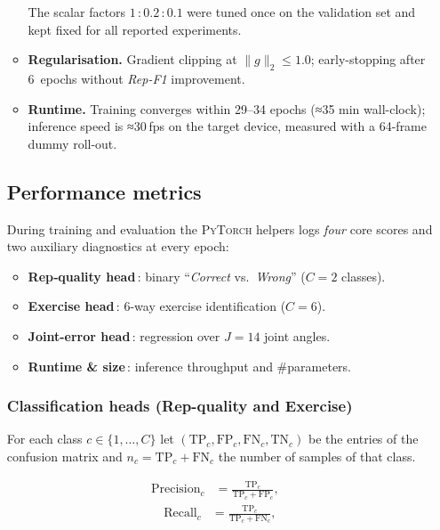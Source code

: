 \documentclass{article}
\begin{document}
\begin{enumerate}[label=\textbf{\Alph*.}, leftmargin=2em, itemsep=6pt]
\begin{itemize}[leftmargin=1.5em, itemsep=4pt]
The scalar factors $1$\,:\,$0.2$\,:\,$0.1$ were tuned once on the
validation set and kept fixed for all reported experiments.

  \item \textbf{Regularisation.}  
        Gradient clipping at $\lVert g\rVert_{2} \le 1.0$;  
        early-stopping after 6~epochs without \textit{Rep-F1} improvement.

  \item \textbf{Runtime.}  
        Training converges within 29–34 epochs (≈35 min wall-clock);  
        inference speed is ≈30 fps on the target device, measured with a
        64-frame dummy roll-out.
\end{itemize}

\subsection{Performance metrics}
\label{sec:metrics}

During training and evaluation the \textsc{PyTorch} helpers logs \emph{four} core scores and two
auxiliary diagnostics at every epoch:

\begin{itemize}[leftmargin=1.5em]
  \item \textbf{Rep‐quality head}\,: binary “\emph{Correct} vs.\ \emph{Wrong}”
        ($C\!=\!2$ classes).
  \item \textbf{Exercise head}\,: 6-way exercise identification
        ($C\!=\!6$).
  \item \textbf{Joint-error head}\,: regression over $J\!=\!14$ joint angles.
  \item \textbf{Runtime \& size}\,: inference throughput and \#parameters.
\end{itemize}

\vspace{.5em}
\subsubsection{Classification heads (Rep-quality and Exercise)}

For each class $c\in\{1,\dots,C\}$ let
$(\text{TP}_c,\text{FP}_c,\text{FN}_c,\text{TN}_c)$ be the entries of
the confusion matrix and $n_c=\text{TP}_c+\text{FN}_c$ the number of
samples of that class.

\begin{align}
  \text{Precision}_c
  &=\frac{\text{TP}_c}{\text{TP}_c+\text{FP}_c},            & \end{align}
  \begin{align} \text{Recall}_c
  &=\frac{\text{TP}_c}{\text{TP}_c+\text{FN}_c},
  \label{eq:prec_recall}
\end{align}


\end{enumerate}
\end{document}
